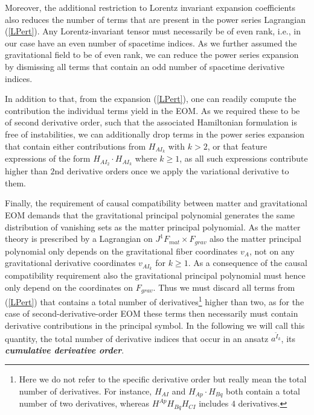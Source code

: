 Moreover, the additional restriction to Lorentz invariant expansion coefficients also reduces the number of terms that are present in the power series Lagrangian (\ref{LPert}). Any Lorentz-invariant tensor must necessarily be of even rank, i.e., in our case have an even number of spacetime indices. As we further assumed the gravitational field to be of even rank, we can reduce the power series expansion by dismissing all terms that contain an odd number of spacetime derivative indices.

In addition to that, from the expansion (\ref{LPert}), one can readily compute the contribution the individual terms yield in the EOM.  As we required these to be of second derivative order, such that the associated Hamiltonian formulation is free of instabilities, we can additionally drop terms in the power series expansion that contain either contributions from $H_{AI_k}$ with $k>2$, or that feature expressions of the form $H_{AI_2}\cdot H_{AI_k}$ where $k\geq 1$, as all such expressions contribute higher than $2$nd derivative orders once we apply the variational derivative to them.

Finally, the requirement of causal compatibility between matter and gravitational EOM demands that the gravitational principal polynomial generates the same distribution of vanishing sets as the matter principal polynomial. As the matter theory is prescribed by a Lagrangian on $J^1F_{mat} \times F_{grav}$ also the matter principal polynomial only depends on the gravitational fiber coordinates $v_A$, not on any gravitational derivative coordinates $v_{AI_k}$ for $k\geq 1$.
As a consequence of the causal compatibility requirement also the gravitational principal polynomial must hence only depend on the coordinates on $F_{grav}$. Thus we must discard all terms from (\ref{LPert}) that contains a total number of derivatives\footnote{Here we do not refer to the specific derivative order but really mean the total number of derivatives. For instance, $H_{AI}$ and $H_{Ap} \cdot H_{Bq}$ both contain a total number of two derivatives, whereas $H^{Ap}H_{Bq}H_{CI}$ includes $4$ derivatives.} higher than two, as for the case of second-derivative-order EOM these terms then necessarily must contain derivative contributions in the principal symbol.
In the following we will call this quantity, the total number of derivative indices that occur in an ansatz $a^{\tilde{I}_k}$, its \textit{\textbf{cumulative derivative order}}.  


